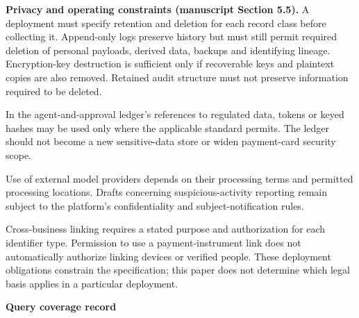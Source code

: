 \documentclass[
  11pt,
]{article}
\begin{document}
\textbf{Privacy and operating constraints (manuscript Section 5.5).} A
deployment must specify retention and deletion for each record class
before collecting it. Append-only logs preserve history but must still
permit required deletion of personal payloads, derived data, backups and
identifying lineage. Encryption-key destruction is sufficient only if
recoverable keys and plaintext copies are also removed. Retained audit
structure must not preserve information required to be deleted.

In the agent-and-approval ledger's references to regulated data, tokens
or keyed hashes may be used only where the applicable standard permits.
The ledger should not become a new sensitive-data store or widen
payment-card security scope.

Use of external model providers depends on their processing terms and
permitted processing locations. Drafts concerning suspicious-activity
reporting remain subject to the platform's confidentiality and
subject-notification rules.

Cross-business linking requires a stated purpose and authorization for
each identifier type. Permission to use a payment-instrument link does
not automatically authorize linking devices or verified people. These
deployment obligations constrain the specification; this paper does not
determine which legal basis applies in a particular deployment.


\textbf{Query coverage record}
\end{document}
